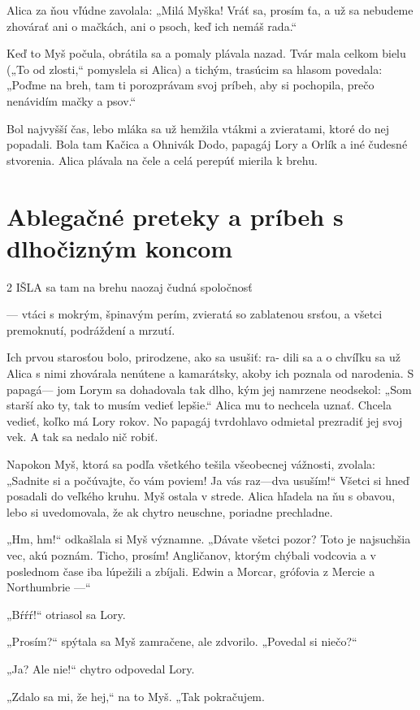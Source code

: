 \documentclass[12pt]{book}
\begin{document}
\begin{Parallel}[p]{}{}
{Alica za ňou vľúdne zavolala: „Milá Myška! Vráť sa,
prosím ťa, a už sa nebudeme zhovárať ani o mačkách, ani
o psoch, keď ich nemáš rada.“

Keď to Myš počula, obrátila sa a pomaly plávala nazad.
Tvár mala celkom bielu („To od zlosti,“ pomyslela si Alica)
a tichým, trasúcim sa hlasom povedala: „Poďme na breh,
tam ti porozprávam svoj príbeh, aby si pochopila, prečo
nenávidím mačky a psov.“

Bol najvyšší čas, lebo mláka sa už hemžila vtákmi
a zvieratami, ktoré do nej popadali. Bola tam Kačica
a Ohnivák Dodo, papagáj Lory a Orlík a iné čudesné
stvorenia. Alica plávala na čele a celá perepúť mierila
k brehu.

\section{Ablegačné preteky a príbeh s dlhočizným koncom}

2 IŠLA sa tam na brehu naozaj čudná spoločnosť

— vtáci s mokrým, špinavým perím, zvieratá
so zablatenou srsťou, a všetci premoknutí, podráždení
a mrzutí.

Ich prvou starosťou bolo, prirodzene, ako sa usušiť: ra-
dili sa a o chvíľku sa už Alica s nimi zhovárala nenútene
a kamarátsky, akoby ich poznala od narodenia. S papagá—
jom Lorym sa dohadovala tak dlho, kým jej namrzene
neodsekol: „Som starší ako ty, tak to musím vedieť lepšie.“
Alica mu to nechcela uznať. Chcela vedieť, koľko má Lory
rokov. No papagáj tvrdohlavo odmietal prezradiť jej svoj
vek. A tak sa nedalo nič robiť.

Napokon Myš, ktorá sa podľa všetkého tešila všeobecnej
vážnosti, zvolala: „Sadnite si a počúvajte, čo vám poviem!
Ja vás raz—dva usuším!“ Všetci si hneď posadali do veľkého
kruhu. Myš ostala v strede. Alica hľadela na ňu s obavou,
lebo si uvedomovala, že ak chytro neuschne, poriadne
prechladne.

„Hm, hm!“ odkašlala si Myš významne. „Dávate všetci
pozor? Toto je najsuchšia vec, akú poznám. Ticho, prosím!
Angličanov, ktorým chýbali vodcovia a v poslednom čase
iba lúpežili a zbíjali. Edwin a Morcar, grófovia z Mercie
a Northumbrie —“

„Bŕŕŕ!“ otriasol sa Lory.

„Prosím?“ spýtala sa Myš zamračene, ale zdvorilo.
„Povedal si niečo?“

„Ja? Ale nie!“ chytro odpovedal Lory.

„Zdalo sa mi, že hej,“ na to Myš. „Tak pokračujem.

}
\end{Parallel}
\end{document}
